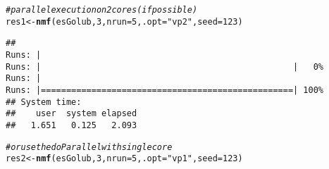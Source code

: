 \documentclass[a4paper]{article}\usepackage[]{graphicx}\usepackage[]{color}
\makeatletter
\newcommand{\hlnum}[1]{\textcolor[rgb]{0.686,0.059,0.569}{#1}}%
\newcommand{\hlstr}[1]{\textcolor[rgb]{0.192,0.494,0.8}{#1}}%
\newcommand{\hlcom}[1]{\textcolor[rgb]{0.678,0.584,0.686}{\textit{#1}}}%
\newcommand{\hlstd}[1]{\textcolor[rgb]{0.345,0.345,0.345}{#1}}%
\newcommand{\hlkwb}[1]{\textcolor[rgb]{0.69,0.353,0.396}{#1}}%
\newcommand{\hlkwc}[1]{\textcolor[rgb]{0.333,0.667,0.333}{#1}}%
\newcommand{\hlkwd}[1]{\textcolor[rgb]{0.737,0.353,0.396}{\textbf{#1}}}%
\newenvironment{kframe}{%
 \def\at@end@of@kframe{}%
 \ifinner\ifhmode%
  \def\at@end@of@kframe{\end{minipage}}%
  \begin{minipage}{\columnwidth}%
 \fi\fi%
 \def\FrameCommand##1{\hskip\@totalleftmargin \hskip-\fboxsep
 \colorbox{shadecolor}{##1}\hskip-\fboxsep
     \hskip-\linewidth \hskip-\@totalleftmargin \hskip\columnwidth}%
 \MakeFramed {\advance\hsize-\width
   \@totalleftmargin\z@ \linewidth\hsize
   \@setminipage}}%
 {\par\unskip\endMakeFramed%
 \at@end@of@kframe}
\newenvironment{knitrout}{}{} %
\makeatother
\begin{document}
\begin{knitrout}
\color{fgcolor}\begin{kframe}
\begin{alltt}
\hlcom{# parallel execution on 2 cores (if possible)}
\hlstd{res1} \hlkwb{<-} \hlkwd{nmf}\hlstd{(esGolub,} \hlnum{3}\hlstd{,} \hlkwc{nrun} \hlstd{=} \hlnum{5}\hlstd{,} \hlkwc{.opt} \hlstd{=} \hlstr{"vp2"}\hlstd{,} \hlkwc{seed} \hlstd{=} \hlnum{123}\hlstd{)}
\end{alltt}


{\ttfamily\noindent\itshape\color{messagecolor}{\#\# NMF algorithm: 'brunet'\\\#\# Multiple runs: 5\\\#\# Mode: parallel (2/4 core(s))}}\begin{verbatim}
## 
Runs: |                                                        
Runs: |                                                  |   0%
Runs: |                                                        
Runs: |==================================================| 100%
## System time:
##    user  system elapsed 
##   1.651   0.125   2.093
\end{verbatim}
\begin{alltt}
\hlcom{# or use the doParallel with single core}
\hlstd{res2} \hlkwb{<-} \hlkwd{nmf}\hlstd{(esGolub,} \hlnum{3}\hlstd{,} \hlkwc{nrun} \hlstd{=} \hlnum{5}\hlstd{,} \hlkwc{.opt} \hlstd{=} \hlstr{"vp1"}\hlstd{,} \hlkwc{seed} \hlstd{=} \hlnum{123}\hlstd{)}
\end{alltt}



\end{kframe}
\end{knitrout}
\end{document}
